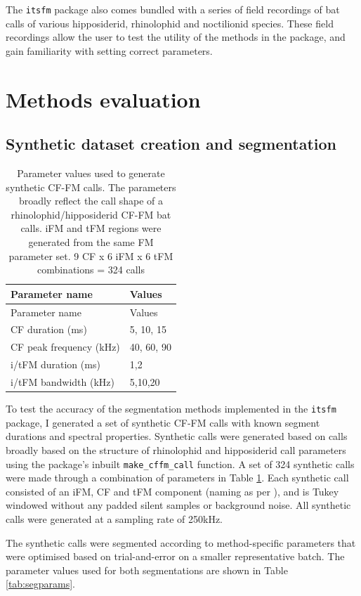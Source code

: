 \documentclass[
]{book}
\begin{document}
The \texttt{itsfm} package also comes bundled with a series of field recordings of bat calls of various hipposiderid, rhinolophid and noctilionid species. These field recordings allow the user to test the utility of the methods in the package, and gain familiarity with setting correct parameters.

\hypertarget{methods-evaluation}{%
\section{Methods evaluation}\label{methods-evaluation}}

\hypertarget{synthetic-dataset-creation-and-segmentation}{%
\subsection{Synthetic dataset creation and segmentation}\label{synthetic-dataset-creation-and-segmentation}}

\begin{longtable}[]{@{}ll@{}}
\caption{\label{tab:synthtable} Parameter values used to generate synthetic CF-FM calls. The parameters broadly reflect the call shape of a rhinolophid/hipposiderid CF-FM bat calls. iFM and tFM regions were generated from the same FM parameter set. 9 CF x 6 iFM x 6 tFM combinations = 324 calls}\tabularnewline
\toprule
Parameter name & Values\tabularnewline
\midrule
\endfirsthead
\toprule
Parameter name & Values\tabularnewline
\midrule
\endhead
CF duration (ms) & 5, 10, 15\tabularnewline
CF peak frequency (kHz) & 40, 60, 90\tabularnewline
i/tFM duration (ms) & 1,2\tabularnewline
i/tFM bandwidth (kHz) & 5,10,20\tabularnewline
\bottomrule
\end{longtable}

To test the accuracy of the segmentation methods implemented in the \texttt{itsfm} package, I generated a set of synthetic CF-FM calls with known segment durations and spectral properties. Synthetic calls were generated based on calls broadly based on the structure of rhinolophid and hipposiderid call parameters using the package's inbuilt \texttt{make\_cffm\_call} function. A set of 324 synthetic calls were made through a combination of parameters in Table \ref{tab:synthtable}. Each synthetic call consisted of an iFM, CF and tFM component (naming as per \citep{tian1997echolocation}), and is Tukey windowed without any padded silent samples or background noise. All synthetic calls were generated at a sampling rate of 250kHz.

The synthetic calls were segmented according to method-specific parameters that were optimised based on trial-and-error on a smaller representative batch. The parameter values used for both segmentations are shown in Table \ref{tab:segparams}.
\end{document}
